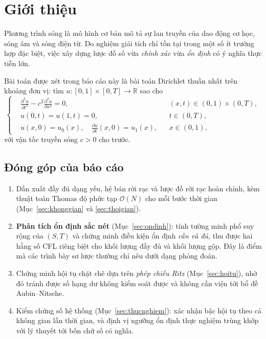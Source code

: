 \documentclass[11pt,a4paper]{article}
\theoremstyle{plain}
\theoremstyle{definition}
\theoremstyle{remark}
\newcommand{\R}{\mathbb{R}}
\begin{document}
\tableofcontents
\clearpage

\section{Giới thiệu}
\label{sec:gioithieu}

Phương trình sóng là mô hình cơ bản mô tả sự lan truyền của dao động cơ học,
sóng âm và sóng điện từ. Do nghiệm giải tích chỉ tồn tại trong một số ít
trường hợp đặc biệt, việc xây dựng lược đồ số vừa \emph{chính xác} vừa
\emph{ổn định} có ý nghĩa thực tiễn lớn.

Bài toán được xét trong báo cáo này là bài toán Dirichlet thuần nhất trên
khoảng đơn vị: tìm $u : [0,1] \times [0,T] \to \R$ sao cho
\begin{equation}
\label{eq:strong}
\left\{
\begin{aligned}
 &\frac{\partial^{2}u}{\partial t^{2}}
   - c^{2}\frac{\partial^{2}u}{\partial x^{2}} = 0,
   && (x,t) \in (0,1)\times(0,T), \\[2pt]
 &u(0,t) = u(1,t) = 0, && t \in (0,T), \\[2pt]
 &u(x,0) = u_{0}(x), \quad \frac{\partial u}{\partial t}(x,0) = u_{1}(x),
   && x \in (0,1),
\end{aligned}
\right.
\end{equation}
với vận tốc truyền sóng $c > 0$ cho trước.

\subsection*{Đóng góp của báo cáo}

\begin{enumerate}
  \item Dẫn xuất đầy đủ dạng yếu, hệ bán rời rạc và lược đồ rời rạc hoàn
        chỉnh, kèm thuật toán Thomas độ phức tạp $\mathcal{O}(N)$ cho mỗi
        bước thời gian (Mục~\ref{sec:khonggian} và \ref{sec:thoigian}).
  \item \textbf{Phân tích ổn định sắc nét} (Mục~\ref{sec:ondinh}): tính tường
        minh phổ suy rộng của $(S,T)$ và chứng minh điều kiện ổn định
        \emph{cần và đủ}, thu được hai hằng số CFL riêng biệt cho khối lượng
        đầy đủ và khối lượng gộp. Đây là điểm mà các trình bày sơ lược
        thường chỉ nêu dưới dạng phỏng đoán.
  \item Chứng minh hội tụ chặt chẽ dựa trên \emph{phép chiếu Ritz}
        (Mục~\ref{sec:hoitu}), nhờ đó tránh được số hạng dư không kiểm soát
        được và không cần viện tới bổ đề Aubin--Nitsche.
  \item Kiểm chứng số hệ thống (Mục~\ref{sec:thucnghiem}): xác nhận bậc hội tụ
        theo cả không gian lẫn thời gian, và định vị ngưỡng ổn định thực
        nghiệm trùng khớp với lý thuyết tới bốn chữ số có nghĩa.
\end{enumerate}
\end{document}
